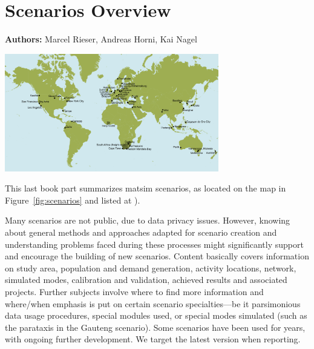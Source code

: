 \chapter{Scenarios Overview}
\label{ch:scenarios}

\hfill \textbf{Authors:} Marcel Rieser, Andreas Horni, Kai Nagel

\begin{center} \includegraphics[width=0.7\textwidth, angle=0]{./scenarios/figures/MATSimModelsMap} \end{center}


This last book part summarizes \gls{matsim} scenarios, as located on the map in Figure~\ref{fig:scenarios} and listed at \citet[][]{MATSIM-Scenarios_Webpage_2015}).

Many scenarios are not public, due to data privacy issues. However, knowing about general methods and approaches adapted for scenario creation and understanding problems faced during these processes might significantly support and encourage the building of new scenarios. Content basically covers information on study area, population and demand generation, activity locations, network, simulated modes, calibration and validation, achieved results and associated projects. Further subjects involve where to find more information and where/when emphasis is put on certain scenario specialties---be it parsimonious data usage procedures, special modules used, or special modes simulated (such as the parataxis in the Gauteng scenario). Some scenarios have been used for years, with ongoing further development. We target the latest version when reporting. 

